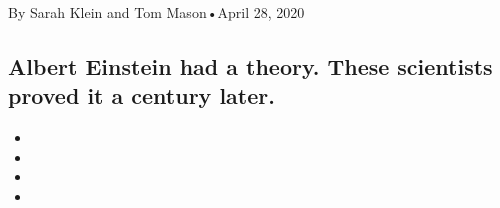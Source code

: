 By Sarah Klein and Tom Mason•April 28, 2020

\hypertarget{albert-einstein-had-a-theory-these-scientists-proved-it-a-century-later-1}{%
\subsection{Albert Einstein had a theory. These scientists proved it a
century
later.}\label{albert-einstein-had-a-theory-these-scientists-proved-it-a-century-later-1}}

\begin{itemize}
\item
\item
\item
\item
\end{itemize}

